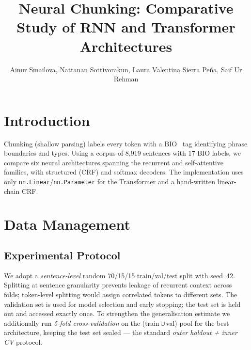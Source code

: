 \documentclass[10pt,a4paper,twocolumn]{article}
\title{\textbf{Neural Chunking: Comparative Study of RNN and Transformer Architectures}}
\author{Ainur Smailova, Nattanan Sottivorakun, Laura Valentina Sierra Peña, Saif Ur Rehman}
\date{}
\begin{document}

\section*{Introduction}
\label{sec:intro}

Chunking (shallow parsing) labels every token with a BIO~\citep{Ramshaw1995,Sang1999}
tag identifying phrase boundaries and types. Using a corpus of 8{,}919 sentences
with 17 BIO labels, we compare six neural architectures spanning the recurrent
and self-attentive families, with structured (CRF) and softmax decoders.
The implementation uses only \texttt{nn.Linear}/\texttt{nn.Parameter} for the
Transformer and a hand-written linear-chain CRF.

\section*{Data Management}
\label{sec:data}

\subsection*{Experimental Protocol}
We adopt a \emph{sentence-level} random 70/15/15 train/val/test split with
seed~42. Splitting at sentence granularity prevents leakage of recurrent
context across folds; token-level splitting would assign correlated tokens to
different sets. The validation set is used for model selection and early
stopping; the test set is held out and accessed exactly once. To strengthen
the generalisation estimate we additionally run \emph{5-fold cross-validation}
on the (train\,$\cup$\,val) pool for the best architecture, keeping the test
set sealed — the standard \emph{outer holdout + inner CV} protocol.
\end{document}
